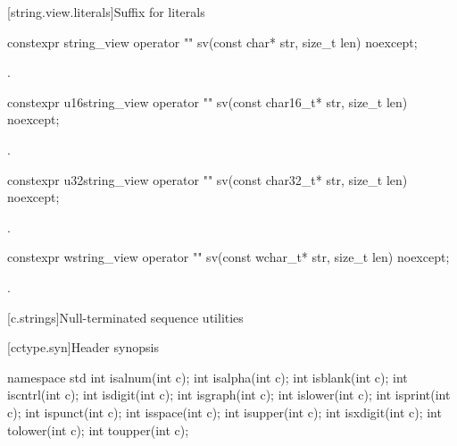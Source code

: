 [string.view.literals]{Suffix for  literals}

%
\begin{itemdecl}
constexpr string_view operator "" sv(const char* str, size_t len) noexcept;
\end{itemdecl}

\begin{itemdescr}
\pnum
\returns
{}.
\end{itemdescr}

%
\begin{itemdecl}
constexpr u16string_view operator "" sv(const char16_t* str, size_t len) noexcept;
\end{itemdecl}
\begin{itemdescr}
\pnum
\returns
{}.
\end{itemdescr}

%
\begin{itemdecl}
constexpr u32string_view operator "" sv(const char32_t* str, size_t len) noexcept;
\end{itemdecl}
\begin{itemdescr}
\pnum
\returns
{}.
\end{itemdescr}

%
\begin{itemdecl}
constexpr wstring_view operator "" sv(const wchar_t* str, size_t len) noexcept;
\end{itemdecl}
\begin{itemdescr}
\pnum
\returns
{}.
\end{itemdescr}


[c.strings]{Null-terminated sequence utilities}

[cctype.syn]{Header  synopsis}

%
%
%
%
%
%
%
%
%
%
%
%
%
%
%
%
\begin{codeblock}
namespace std {
  int isalnum(int c);
  int isalpha(int c);
  int isblank(int c);
  int iscntrl(int c);
  int isdigit(int c);
  int isgraph(int c);
  int islower(int c);
  int isprint(int c);
  int ispunct(int c);
  int isspace(int c);
  int isupper(int c);
  int isxdigit(int c);
  int tolower(int c);
  int toupper(int c);
}
\end{codeblock}

